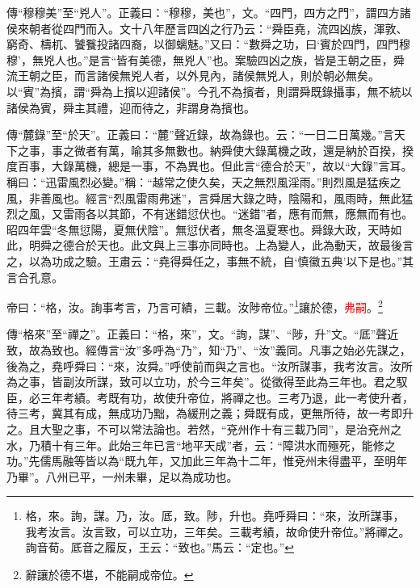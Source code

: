 {\noindent\zhuan{}\fzbyks 傳“穆穆美”至“兇人”。正義曰：“穆穆，美也”，文。“四門，四方之門”，謂四方諸侯來朝者從四門而入。文十八年歷言四凶之行乃云：“舜臣堯，流四凶族，渾敦、窮奇、檮杌、饕餮投諸四裔，以御螭魅。”又曰：“數舜之功，曰‘賓於四門，四門穆穆’，無兇人也。”是言“皆有美德，無兇人”也。案驗四凶之族，皆是王朝之臣，舜流王朝之臣，而言諸侯無兇人者，以外見內，諸侯無兇人，則於朝必無矣。以“賓”為擯，謂“舜為上擯以迎諸侯”。今孔不為擯者，則謂舜既錄攝事，無不統以諸侯為賓，舜主其禮，迎而待之，非謂身為擯也。 \par}

{\noindent\zhuan{}\fzbyks 傳“麓錄”至“於天”。正義曰：“麓”聲近錄，故為錄也。云：“一日二日萬幾。”言天下之事，事之微者有萬，喻其多無數也。納舜使大錄萬機之政，還是納於百揆，揆度百事，大錄萬機，總是一事，不為異也。但此言“德合於天”，故以“大錄”言耳。稱曰：“迅雷風烈必變。”稱：“越常之使久矣，天之無烈風淫雨。”則烈風是猛疾之風，非善風也。經言“烈風雷雨弗迷”，言舜居大錄之時，陰陽和，風雨時，無此猛烈之風，又雷雨各以其節，不有迷錯愆伏也。“迷錯”者，應有而無，應無而有也。昭四年雲“冬無愆陽，夏無伏陰”。無愆伏者，無冬溫夏寒也。舜錄大政，天時如此，明舜之德合於天也。此文與上三事亦同時也。上為變人，此為動天，故最後言之，以為功成之驗。王肅云：“堯得舜任之，事無不統，自‘慎徽五典’以下是也。”其言合孔意。 \par}

帝曰：“格，汝。詢事考言，乃言可績，三載。汝陟帝位。”\footnote{格，來。詢，謀。乃，汝。厎，致。陟，升也。堯呼舜曰：“來，汝所謀事，我考汝言。汝言致，可以立功，三年矣。三載考績，故命使升帝位。”將禪之。詢音荀。厎音之履反，王云：“致也。”馬云：“定也。”}讓於德，\textcolor{red}{弗嗣}。\footnote{辭讓於德不堪，不能嗣成帝位。}

{\noindent\zhuan{}\fzbyks 傳“格來”至“禪之”。正義曰：“格，來”，文。“詢，謀”、“陟，升”文。“厎”聲近致，故為致也。經傳言“汝”多呼為“乃”，知“乃”、“汝”義同。凡事之始必先謀之，後為之，堯呼舜曰：“來，汝舜。”呼使前而與之言也。“汝所謀事，我考汝言。汝所為之事，皆副汝所謀，致可以立功，於今三年矣”。從徵得至此為三年也。君之馭臣，必三年考績。考既有功，故使升帝位，將禪之也。三考乃退，此一考使升者，待三考，冀其有成，無成功乃黜，為緩刑之義；舜既有成，更無所待，故一考即升之。且大聖之事，不可以常法論也。若然，“兗州作十有三載乃同”，是治兗州之水，乃積十有三年。此始三年已言“地平天成”者，云：“障洪水而殛死，能修之功。”先儒馬融等皆以為“既九年，又加此三年為十二年，惟兗州未得盡平，至明年乃畢”。八州已平，一州未畢，足以為成功也。 \par}

